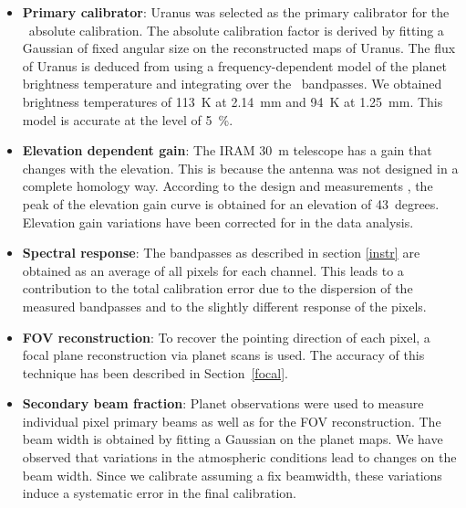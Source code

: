 \begin{itemize}

\item {\bfseries Primary calibrator}:  Uranus was selected as the primary calibrator 
for the \NIKA\ absolute calibration. The absolute calibration factor is derived by fitting 
a Gaussian of fixed angular size on the reconstructed maps of Uranus. 
The flux of Uranus is deduced from \cite{moreno2010,planckii}  using a frequency-dependent
model of the planet brightness temperature and integrating over the \NIKA\ bandpasses. We obtained brightness temperatures of 113~K at 2.14~mm and 94~K at 1.25~mm. This model is accurate at the 
level of 5~\%. 

\item {\bfseries Elevation dependent gain}: The IRAM 30~m telescope has 
a gain that changes with the elevation. This is because the antenna was not designed in a complete homology way. 
According to the design and measurements \citep{Greve, kramer}, the peak
of the elevation gain curve is obtained for an elevation of 43~degrees. 
Elevation gain variations have been corrected for in the data analysis.

\item {\bfseries Spectral response}: The bandpasses as described in section
  \ref{instr} are obtained as an average of all pixels for each channel. This
  leads to a contribution to the total calibration error due to the dispersion
  of the measured bandpasses and to the slightly different response of the
  pixels.

\item {\bfseries FOV reconstruction}: To recover the
  pointing direction of each pixel, a focal plane reconstruction via planet
  scans is used. The accuracy of this technique has been described in Section~\ref{focal}.

\item {\bfseries Secondary beam fraction}: Planet observations were used to
  measure individual pixel primary beams as well as for the FOV
  reconstruction. The beam width is obtained by fitting a Gaussian on the
  planet maps. We have observed that variations in the atmospheric conditions
  lead to changes on the beam width. Since we calibrate assuming a fix beamwidth,
  these variations induce a systematic error in the final calibration.


\end{itemize}
